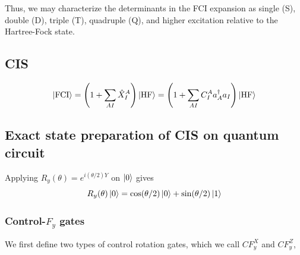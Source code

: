 \documentclass[11pt, oneside]{article}   	%
\begin{document}
Thus, we may characterize the determinants in the FCI expansion as single (S), double (D), triple (T), quadruple (Q), and higher excitation relative to the Hartree-Fock state.

\subsection{CIS}
\begin{equation}
\ket{\text{FCI}} = \left( 1 + \sum_{AI} \hat{X}^A_I \right) \ket{\text{HF}} = \left( 1 + \sum_{AI} C^A_I a^{\dagger}_A a_I \right) \ket{\text{HF}} 
\end{equation}

\subsection{Exact state preparation of CIS on quantum circuit}
Applying $R_y(\theta) = e^{i (\theta/2) Y}$ on $\ket{0}$ gives
\begin{equation}
R_y(\theta) \ket{0} = \cos(\theta/2) \ket{0} + \sin(\theta/2) \ket{1}
\end{equation}

\subsubsection{Control-$F_y$ gates}

We first define two types of control rotation gates, which we call $CF^X_y$ and $CF^Z_y$,
\end{document}
